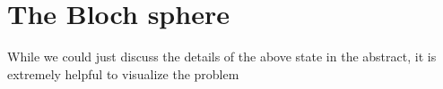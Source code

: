 \section{The Bloch sphere}

While we could just discuss the details of the above state in the abstract, it is extremely helpful to visualize the problem 
